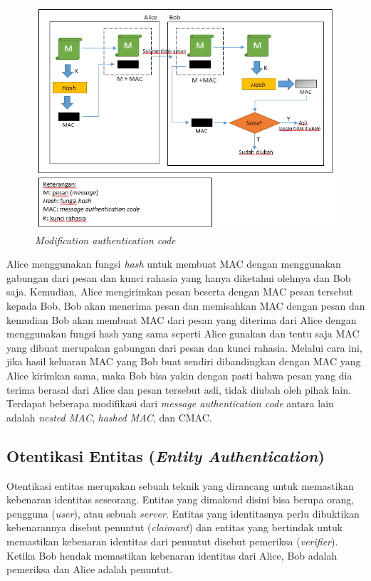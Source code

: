\begin{figure}[ht]
	\includegraphics[scale=0.7]{Gambar/MAC}
	\centering
	\caption{\textit{Modification authentication code}}
\end{figure}

Alice menggunakan fungsi \textit{hash} untuk membuat MAC dengan menggunakan gabungan dari pesan dan kunci rahasia yang hanya diketahui olehnya dan Bob saja. Kemudian, Alice mengirimkan pesan beserta dengan MAC pesan tersebut kepada Bob. Bob akan menerima pesan dan memisahkan MAC dengan pesan dan kemudian Bob akan membuat MAC dari pesan yang diterima dari Alice dengan menggunakan fungsi hash yang sama seperti Alice gunakan dan tentu saja MAC yang dibuat merupakan gabungan dari pesan dan kunci rahasia. Melalui cara ini, jika hasil keluaran MAC yang Bob buat sendiri dibandingkan dengan MAC yang Alice kirimkan sama, maka Bob bisa yakin dengan pasti bahwa pesan yang dia terima berasal dari Alice dan pesan tersebut asli, tidak diubah oleh pihak lain. Terdapat beberapa modifikasi dari \textit{message authentication code} antara lain adalah \textit{nested MAC}, \textit{hashed MAC}, dan CMAC. 

\subsection{Otentikasi Entitas (\textit{Entity Authentication})}
Otentikasi entitas merupakan sebuah teknik yang dirancang untuk memastikan kebenaran identitas seseorang. Entitas yang dimaksud disini bisa berupa orang, pengguna (\textit{user}), atau sebuah \textit{server}. Entitas yang identitasnya perlu dibuktikan kebenarannya disebut penuntut (\textit{claimant}) dan entitas yang bertindak untuk memastikan kebenaran identitas dari penuntut disebut pemeriksa (\textit{verifier}). Ketika Bob hendak memastikan kebenaran identitas dari Alice, Bob adalah pemeriksa dan Alice adalah penuntut.

